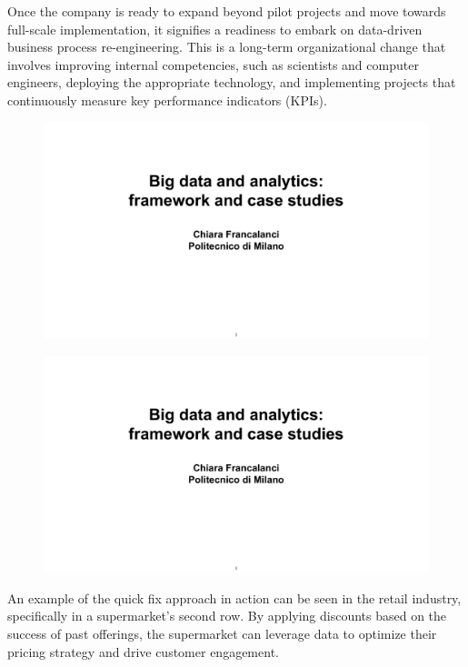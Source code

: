 Once the company is ready to expand beyond pilot projects and move
towards full-scale implementation, it signifies a readiness to embark on
data-driven business process re-engineering. This is a long-term
organizational change that involves improving internal competencies,
such as scientists and computer engineers, deploying the appropriate
technology, and implementing projects that continuously measure key
performance indicators (KPIs).

\begin{figure}[!h]
  \centering
  \includegraphics[page=64, trim = 2cm 4cm 2.5cm 6cm, clip, width=\imagewidth]{images/06 - BIG_DATA.pdf}
\end{figure}

\begin{figure}[!h]
  \centering
  \includegraphics[page=65, trim = 2cm 1.5cm 1.5cm 5.5cm, clip, width=\imagewidth]{images/06 - BIG_DATA.pdf}
\end{figure}

An example of the quick fix approach in action can be seen in the retail
industry, specifically in a supermarket's second row. By applying
discounts based on the success of past offerings, the supermarket can
leverage data to optimize their pricing strategy and drive customer
engagement.

